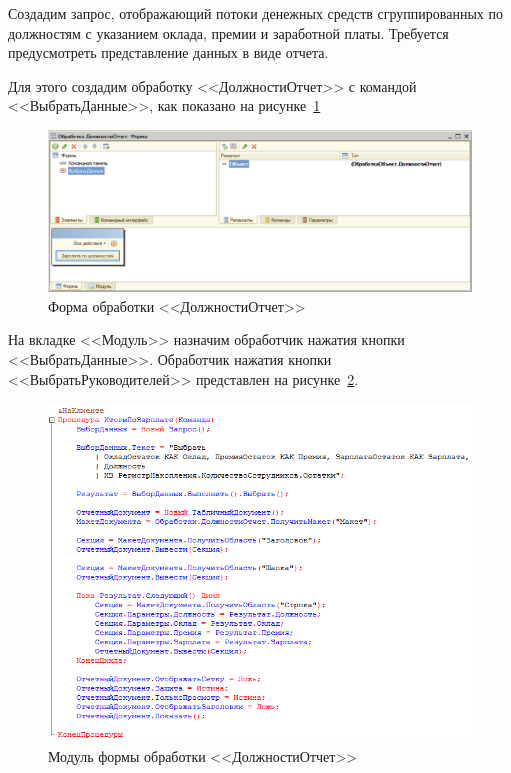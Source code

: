 
Создадим запрос, отображающий потоки денежных средств сгруппированных
по должностям с указанием оклада, премии и заработной платы.
Требуется предусмотреть представление данных в виде отчета.

\pagebreak

Для этого создадим обработку <<ДолжностиОтчет>>
с командой <<ВыбратьДанные>>, как показано на рисунке~\ref{fig:positions_report_form}
\begin{figure}[h!]
  \centering
  \includegraphics[width=140mm]{pic/positions_report_form}
  \caption{Форма обработки <<ДолжностиОтчет>>}
  \label{fig:positions_report_form}
\end{figure}

На вкладке <<Модуль>> назначим обработчик нажатия кнопки <<ВыбратьДанные>>.
Обработчик нажатия кнопки <<ВыбратьРуководителей>> представлен на
рисунке~\ref{fig:positions_report_code}.
\begin{figure}[h!]
  \centering
  \includegraphics[width=140mm]{pic/positions_report_code}
  \caption{Модуль формы обработки <<ДолжностиОтчет>>}
  \label{fig:positions_report_code}
\end{figure}

